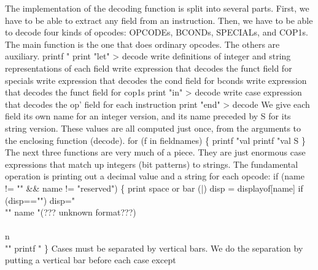 \endcode
{}
The implementation of the decoding function is split into several parts.
First, we have to be able to extract any field from an instruction.
Then, we have to be able to decode four kinds of opcodes:
\code{}OPCODE\edoc{}s, \code{}BCOND\edoc{}s,  \code{}SPECIAL\edoc{}s, and \code{}COP1\edoc{}s.
The main function is the one that does ordinary opcodes.
The others are auxiliary.
\enddocs
{}
\endmoddef
printf "%
print "let" > decode
  \LA{}write definitions of integer and string representations of each field\RA{}
  \LA{}write expression that decodes the \code{}funct\edoc{} field for \code{}special\edoc{}s\RA{}
  \LA{}write expression that decodes the \code{}cond\edoc{} field for \code{}bcond\edoc{}s\RA{}
  \LA{}write expression that decodes the \code{}funct\edoc{} field for \code{}cop1\edoc{}s\RA{}
print "in" > decode
  \LA{}write \code{}case\edoc{} expression that decodes the \code{}op'\edoc{} field for each instruction\RA{}
print "end" > decode
\endcode
{}
We give each field its own name for an integer version, and its name
preceded by \code{}S\edoc{} for its string version.
These values are all computed just once, from the arguments to the
enclosing function (\code{}decode\edoc{}).
\enddocs
{}
\endmoddef
for (f in fieldnames) \{
        printf "val %
        printf "val S%
\}
\endcode
{}
The next three functions are very much of a piece.
They are just enormous \code{}case\edoc{} expressions that match up integers
(bit patterns) to strings.
The fundamental operation is printing out a decimal value and a string
for each opcode:
\enddocs
{}
\endmoddef
if (name != ""  && name != "reserved") \{
        \LA{}print space or bar (\code{}|\edoc{})\RA{}
        disp = displayof[name]
        if (disp=="") disp="\\"" name "(??? unknown format???)\\\\n\\""
        printf "%
\}
\endcode
{}
Cases must be separated by vertical bars.
We do the separation by putting a vertical bar before each case except
